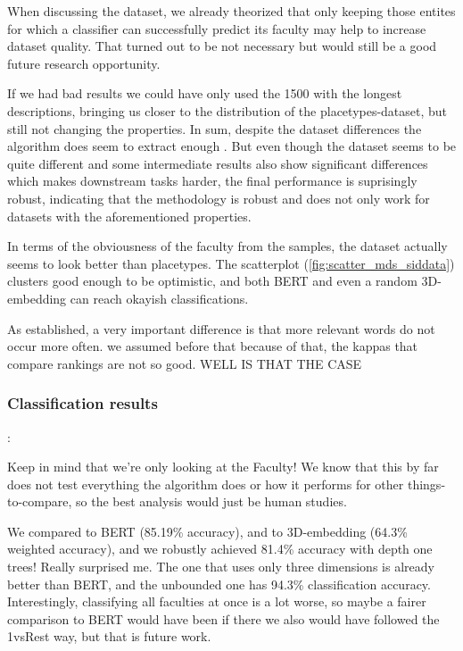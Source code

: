 When discussing the dataset, we already theorized that only keeping those entites for which a classifier can successfully predict its faculty may help to increase dataset quality. That turned out to be not necessary but would still be a good future research opportunity.

If we had bad results we could have only used the 1500 with the longest descriptions, bringing us closer to the distribution of the placetypes-dataset, but still not changing the properties. In sum, despite the dataset differences the algorithm does seem to extract enough . But even though the dataset seems to be quite different and some intermediate results also show significant differences which makes downstream tasks harder, the final performance is suprisingly robust, indicating that the methodology is robust and does not only work for datasets with the aforementioned properties. 

In terms of the obviousness of the faculty from the samples, the dataset actually seems to look better than placetypes. The scatterplot (\autoref{fig:scatter_mds_siddata}) clusters good enough to be optimistic, and both BERT and even a random 3D-embedding can reach okayish classifications.

As established, a very important difference is that more relevant words do not occur more often. we assumed before that because of that, the kappas that compare rankings are not so good. WELL IS THAT THE CASE

\subsubsection{Classification results}

\cite{Ager2018}: 

Keep in mind that we're only looking at the Faculty! We know that this by far does not test everything the algorithm does or how it performs for other things-to-compare, so the best analysis would just be human studies.

We compared to BERT (85.19\% accuracy), and to 3D-embedding (64.3\% weighted accuracy), and we robustly achieved 81.4\% accuracy with depth one trees! Really surprised me. The one that uses only three dimensions is already better than BERT, and the unbounded one has 94.3\% classification accuracy. Interestingly, classifying all faculties at once is a lot worse, so maybe a fairer comparison to BERT would have been if there we also would have followed the 1vsRest way, but that is future work.

